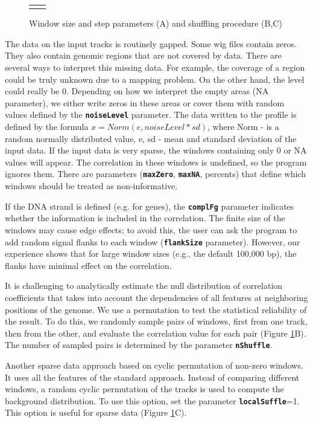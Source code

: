 \documentclass{article}
\newcommand{\tw}{\textwidth}
\newcommand{\prm}[1]{\texttt{\textbf{{#1}}}}
\begin{document}
\begin{figure}
\begin{tabular}{cc}
\begin{minipage}{0.45\tw}
\begin{center}
\end{center}
\end{minipage}
\end{tabular}
\caption{Window size and step parameters (A) and shuffling procedure (B,C)}\label{sh}
\end{figure} 

The data on the input tracks is routinely gapped. Some wig files contain zeros. They also contain genomic regions that are not covered by data. There are several ways to interpret this missing data. For example, the coverage of a region could be truly unknown due to a mapping problem. On the other hand, the level could really be 0. Depending on how we interpret the empty areas (NA parameter), we either write zeros in these areas or cover them with random values defined by the \prm{noiseLevel} parameter. The data written to the profile is defined by the formula $x=Norm(e, noiseLevel*sd)$, where Norm - is a random normally distributed value, e, sd - mean and standard deviation of the input data. If the input data is very sparse, the windows containing only 0 or NA values will appear. The correlation in these windows is undefined, so the program ignores them. There are parameters (\prm{maxZero}, \prm{maxNA}, percents) that define which windows should be treated as non-informative.

If the DNA strand is defined (e.g. for genes), the \prm{complFg} parameter indicates whether the information is included in the correlation. The finite size of the windows may cause edge effects; to avoid this, the user can ask the program to add random signal flanks to each window (\prm{flankSize} parameter). However, our experience shows that for large window sizes (e.g., the default 100,000 bp), the flanks have minimal effect on the correlation. 

It is challenging to analytically estimate the null distribution of correlation coefficients that takes into account the dependencies of all features at neighboring positions of the genome. We use a permutation to test the statistical reliability of the result. To do this, we randomly sample pairs of windows, first from one track, then from the other, and evaluate the correlation value for each pair (Figure \ref{sh}B).  The number of sampled pairs is determined by the parameter \prm{nShuffle}. 

Another sparse data approach based on cyclic permutation of non-zero windows. It uses all the features of the standard approach. Instead of comparing different windows, a random cyclic permutation of the tracks is used to compute the background distribution. To use this option, set the parameter \prm{localSuffle}=1. This option is useful for sparse data (Figure \ref{sh}C).
\end{document}

